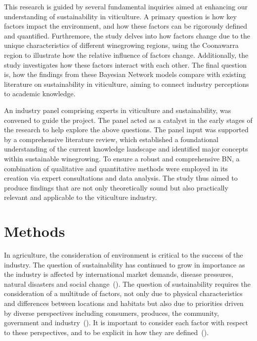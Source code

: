 \documentclass[fleqn,10pt]{wlscirep}
\begin{document}
This research is guided by several fundamental inquiries aimed at enhancing our understanding of sustainability in viticulture. A primary question is how key factors impact the environment, and how these factors can be rigorously defined and quantified. Furthremore, the study delves into how factors change due to the unique characteristics of different winegrowing regions, using the Coonawarra region to illustrate how the relative influence of factors change. Additionally, the study investigates how these factors interact with each other. The final question is, how the findings from these Bayesian Network models compare with existing literature on sustainability in viticulture, aiming to connect industry perceptions to academic knowledge.

An industry panel comprising experts in viticulture and sustainability, was convened to guide the project. The panel acted as a catalyst in the early stages of the research to help explore the above questions. The panel input was supported by a comprehensive literature review, which established a foundational understanding of the current knowledge landscape and identified major concepts within sustainable winegrowing. To ensure a robust and comprehensive BN, a combination of qualitative and quantitative methods were employed in its creation via expert consultations and data analysis. The study thus aimed to produce findings that are not only theoretically sound but also practically relevant and applicable to the viticulture industry.

\section*{Methods}

In agriculture, the consideration of environment is critical to the success of the industry. The question of sustainability has continued to grow in importance as the industry is affected by international market demands, disease pressures, natural disasters and social change~(\cite{wineaustraliaNationalVintageReport2022,wineaustraliaNationalVintageReport2020,wineaustraliaNationalVintageReport2021,cassonMultidisciplinaryApproachAssess2022}). The question of sustainability requires the consideration of a multitude of factors, not only due to physical characteristics and differences between locations and habitats but also due to priorities driven by diverse perspectives including consumers, produces, the community, government and industry~(\cite{baianoOverviewSustainabilityWine2021,wayeCarbonFootprintsFood2008}). It is important to consider each factor with respect to these perspectives, and to be explicit in how they are defined~(\cite{santiago-brownSustainabilityAssessmentWineGrape2015}).
\end{document}
